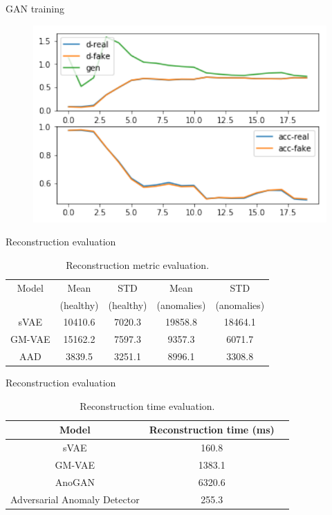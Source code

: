 \documentclass[15pt]{beamer} %
\begin{document}
\begin{frame}{GAN training}
  \begin{figure}
   \centering
   \includegraphics[width=.75\textwidth]{gan_training}
  \end{figure}
\end{frame}

\begin{frame}{Reconstruction evaluation}
 \begin{table}
    \centering
    \caption[Reconstruction metric evaluation]{Reconstruction metric evaluation.}
    \begin{tabular}{ c c c c c }
        \hline
        Model & Mean & STD & Mean & STD \\
        & (healthy) & (healthy) & (anomalies) & (anomalies) \\
        \hline
        sVAE & 10410.6 & 7020.3 & 19858.8 & 18464.1 \\
        GM-VAE & 15162.2 & 7597.3 & 9357.3 & 6071.7 \\
        AAD & 3839.5 & 3251.1 & 8996.1 & 3308.8 \\
        \hline
    \end{tabular}
\end{table}
\end{frame}


\begin{frame}{Reconstruction evaluation}
 \begin{table}[htb]
    \caption[Reconstruction time evaluation]{Reconstruction time evaluation.}
    \label{table:rec_time}
    \centering
    \begin{tabular}{ c c c }
        \hline
        Model & Reconstruction time (ms) \\
        \hline
        sVAE & 160.8 \\
        GM-VAE & 1383.1 \\
        AnoGAN & 6320.6 \\
        Adversarial Anomaly Detector & 255.3 \\
        \hline
    \end{tabular}
\end{table}
\end{frame}
\end{document}
